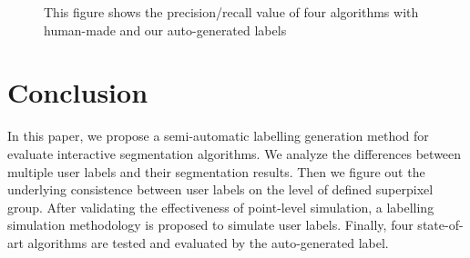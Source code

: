 \documentclass[runningheads,a4paper]{llncs}
\begin{document}
\begin{figure}[!tb]
{}
\caption{This figure shows the precision/recall value of four algorithms with human-made and our auto-generated labels }
\label{fig:pr boxplot}
\end{figure}


\section{Conclusion}
In this paper, we propose a semi-automatic labelling generation method for evaluate interactive segmentation algorithms. We analyze the differences between multiple user labels and their segmentation results. Then we figure out the underlying consistence between user labels on the level of defined superpixel group. After validating the effectiveness of point-level simulation, a labelling simulation methodology is proposed to simulate user labels. Finally, four state-of-art algorithms are tested and evaluated by the auto-generated label.
\end{document}
